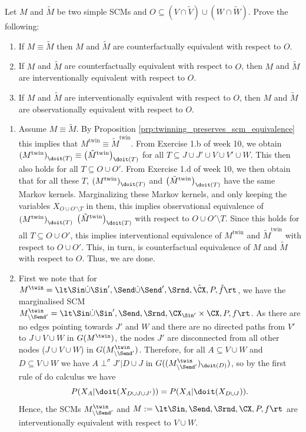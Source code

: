 \begin{enumerate}
	Let $M$ and $\tilde{M}$ be two simple SCMs and $O \subseteq (V \cap \tilde{V}) \cup (W \cap \tilde{W})$.
	Prove the following:
	\begin{enumerate}
		\item If $M \equiv \tilde{M}$ then $M$ and $\tilde{M}$ are counterfactually equivalent with respect to $O$.
		\item If $M$ and $\tilde{M}$ are counterfactually equivalent with respect to $O$, then $M$ and $\tilde{M}$ are interventionally equivalent with respect to $O$.
		\item If $M$ and $\tilde{M}$ are interventionally equivalent with respect to $O$, then $M$ and $\tilde{M}$ are observationally equivalent with respect to $O$.
	\end{enumerate}

	\begin{ungradedsolution}
		\begin{enumerate}
			\item Assume $M \equiv \tilde{M}$.
			By Proposition \ref*{prp:twinning_preserves_scm_equivalence} this implies that $M^{\text{twin}} \equiv \tilde{M}^{\text{twin}}$.
			From Exercise 1.b of week 10, we obtain $\left( M^{\text{twin}}\right)_{\doit(T)} \equiv \left( \tilde{M}^{\text{twin}}\right)_{\doit(T)} $ for all $T \subseteq J \cup J' \cup V \cup V' \cup W$.
			This then also holds for all $T \subseteq O \cup O'$.
			From Exercise 1.d of week 10, we then obtain that for all these $T$, $\left( M^{\text{twin}}\right)_{\doit(T)} $ and $\left( \tilde{M}^{\text{twin}}\right)_{\doit(T)} $ have the same Markov kernels.
			Marginalizing these Markov kernels, and only keeping the variables $X_{O \cup O' \setminus T}$ in them, this implies observational equivalence of $\left( M^{\text{twin}}\right)_{\doit(T)} $ $\left( \tilde{M}^{\text{twin}}\right)_{\doit(T)} $ with respect to $O \cup O' \setminus T$.
			Since this holds for all $T \subseteq O \cup O'$, this implies interventional equivalence of $M^{\text{twin}}$ and $\tilde{M}^{\text{twin}}$ with respect to $O \cup O'$.
			This, in turn, is counterfactual equivalence of $M$ and $\tilde{M}$ with respect to $O$.
			Thus, we are done.
			\item First we note that for $M^\twin = \lt \Sin \dot\cup \Sin', \Send \dot\cup \Send', \Srnd, \tilde{\CX}, P, \tilde{f} \rt$, we have the marginalised SCM $M^\twin_{\setminus \Send'} = \lt \Sin \dot\cup \Sin', \Send, \Srnd, \CX_{\Sin'}\times \CX, P, f \rt$. As there are no edges pointing towards $J'$ and $W$ and there are no directed paths from $V'$ to $J\cup V\cup W$ in $G(M^\twin)$, the nodes $J'$ are disconnected from all other nodes ($J\cup V\cup W$) in $G(M^\twin_{\setminus \Send'})$. Therefore, for all $A\subseteq V\cup W$ and $D\subseteq V\cup W$ we have $A\perp^\sigma J' | D\cup J$ in $G((M^\twin_{\setminus \Send'})_{\doit(D)})$, so by the first rule of do calculus we have
			$$P(X_A | \doit(X_{D\cup J \cup J'})) = P(X_A | \doit(X_{D\cup J})).$$
			Hence, the SCMs $M^\twin_{\setminus \Send'}$ and $M := \lt \Sin, \Send, \Srnd, \CX, P, f \rt$ are interventionally equivalent with respect to $V\cup W$.



\end{enumerate}
\end{ungradedsolution}
\end{enumerate}
